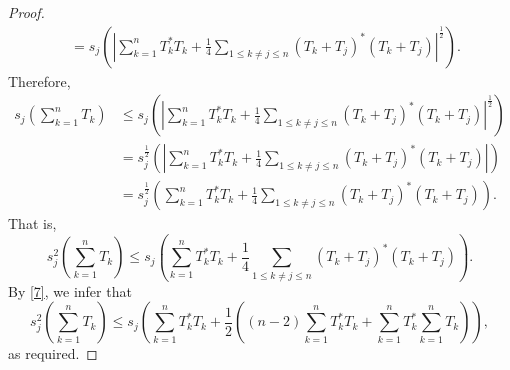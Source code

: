 \documentclass[12pt,twoside,reqno]{amsart}
\numberwithin{equation}{section}
\begin{document}
\begin{proof}
\[\begin{aligned}
 & ={{s}_{j}}\left( {{\left| \sum\limits_{k=1}^{n}{T_{k}^{*}{{T}_{k}}}+\frac{1}{4}\sum\limits_{1\le k\ne j\le n}{{{\left( {{T}_{k}}+{{T}_{j}} \right)}^{*}}\left( {{T}_{k}}+{{T}_{j}} \right)} \right|}^{\frac{1}{2}}} \right).
\end{aligned}\]
Therefore,
	\[\begin{aligned}
   {{s}_{j}}\left( \sum\limits_{k=1}^{n}{{{T}_{k}}} \right)&\le {{s}_{j}}\left( {{\left| \sum\limits_{k=1}^{n}{T_{k}^{*}{{T}_{k}}}+\frac{1}{4}\sum\limits_{1\le k\ne j\le n}{{{\left( {{T}_{k}}+{{T}_{j}} \right)}^{*}}\left( {{T}_{k}}+{{T}_{j}} \right)} \right|}^{\frac{1}{2}}} \right) \\ 
 & =s_{j}^{\frac{1}{2}}\left( \left| \sum\limits_{k=1}^{n}{T_{k}^{*}{{T}_{k}}}+\frac{1}{4}\sum\limits_{1\le k\ne j\le n}{{{\left( {{T}_{k}}+{{T}_{j}} \right)}^{*}}\left( {{T}_{k}}+{{T}_{j}} \right)} \right| \right) \\ 
 & =s_{j}^{\frac{1}{2}}\left( \sum\limits_{k=1}^{n}{T_{k}^{*}{{T}_{k}}}+\frac{1}{4}\sum\limits_{1\le k\ne j\le n}{{{\left( {{T}_{k}}+{{T}_{j}} \right)}^{*}}\left( {{T}_{k}}+{{T}_{j}} \right)} \right).  
\end{aligned}\]
That is,
	\[s_{j}^{2}\left( \sum\limits_{k=1}^{n}{{{T}_{k}}} \right)\le {{s}_{j}}\left( \sum\limits_{k=1}^{n}{T_{k}^{*}{{T}_{k}}}+\frac{1}{4}\sum\limits_{1\le k\ne j\le n}{{{\left( {{T}_{k}}+{{T}_{j}} \right)}^{*}}\left( {{T}_{k}}+{{T}_{j}} \right)} \right).\]
By \eqref{7}, we infer that
\[s_{j}^{2}\left( \sum\limits_{k=1}^{n}{{{T}_{k}}} \right)\le {{s}_{j}}\left( \sum\limits_{k=1}^{n}{T_{k}^{*}{{T}_{k}}}+\frac{1}{2}\left( \left( n-2 \right)\sum\limits_{k=1}^{n}{T_{k}^{*}{{T}_{k}}}+\sum\limits_{k=1}^{n}{T_{k}^{*}}\sum\limits_{k=1}^{n}{{{T}_{k}}} \right) \right),\]
as required.
\end{proof}
\end{document}
